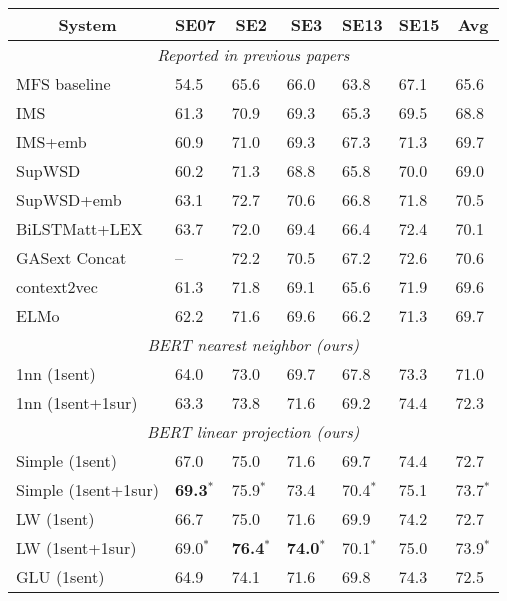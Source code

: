 \documentclass[11pt,a4paper]{article}
\begin{document}
\begin{table*}[ht]
\centering
\begin{tabular}{|l|l||l|l|l|l|l|}
\hline
\multicolumn{1}{|c|}{\textbf{System}} & \multicolumn{1}{c||}{\textbf{SE07}} & \multicolumn{1}{c|}{\textbf{SE2}} & \multicolumn{1}{c|}{\textbf{SE3}} & \multicolumn{1}{c|}{\textbf{SE13}} & \multicolumn{1}{c|}{\textbf{SE15}} & \multicolumn{1}{c|}{\textbf{Avg}}\\
\hline
\multicolumn{7}{|c|}{\textit{Reported in previous papers}}\\
\hline
MFS baseline & 54.5 & 65.6 & 66.0 & 63.8 & 67.1 & 65.6\\
\hline
IMS \cite{zhong_it_2010} & 61.3 & 70.9 & 69.3 & 65.3 & 69.5 & 68.8\\
IMS+emb \cite{iacobacci_embeddings_2016} & 60.9 & 71.0 & 69.3 & 67.3 & 71.3 & 69.7\\
SupWSD \cite{papandrea_supwsd:_2017} & 60.2 & 71.3 & 68.8 & 65.8 & 70.0 & 69.0\\
SupWSD+emb \cite{papandrea_supwsd:_2017} & 63.1 & 72.7 & 70.6 & 66.8 & 71.8 & 70.5\\
\hline
BiLSTMatt+LEX \cite{raganato_neural_2017} & 63.7 & 72.0 & 69.4 & 66.4 & 72.4 & 70.1\\
GASext Concat \cite{luo_incorporating_2018} & -- & 72.2 & 70.5 & 67.2 & 72.6 & 70.6\\
\hline
context2vec \cite{melamud_context2vec:_2016} & 61.3 & 71.8 & 69.1 & 65.6 & 71.9 & 69.6\\
ELMo \cite{peters_deep_2018} & 62.2 & 71.6 & 69.6 & 66.2 & 71.3 & 69.7\\
\hline
\multicolumn{7}{|c|}{\textit{BERT nearest neighbor (ours)}}\\
\hline
1nn (1sent) & 64.0 & 73.0 & 69.7 & 67.8 & 73.3 & 71.0\\
1nn (1sent+1sur) & 63.3 & 73.8 & 71.6 & 69.2 & 74.4 & 72.3\\
\hline
\multicolumn{7}{|c|}{\textit{BERT linear projection (ours)}}\\
\hline
Simple (1sent) & 67.0 & 75.0 & 71.6 & 69.7 & 74.4 & 72.7\\
Simple (1sent+1sur) & \textbf{69.3}$^{*}$ & 75.9$^{*}$ & 73.4 & 70.4$^{*}$ & 75.1 & 73.7$^{*}$\\\hline
LW (1sent) & 66.7 & 75.0 & 71.6 & 69.9 & 74.2 & 72.7 \\
LW (1sent+1sur) & 69.0$^{*}$ & \textbf{76.4}$^{*}$ & \textbf{74.0}$^{*}$ & 70.1$^{*}$ & 75.0 & 73.9$^{*}$\\\hline
GLU (1sent) & 64.9 & 74.1 & 71.6 & 69.8 & 74.3 & 72.5 \\

\end{tabular}
\end{table*}
\end{document}
